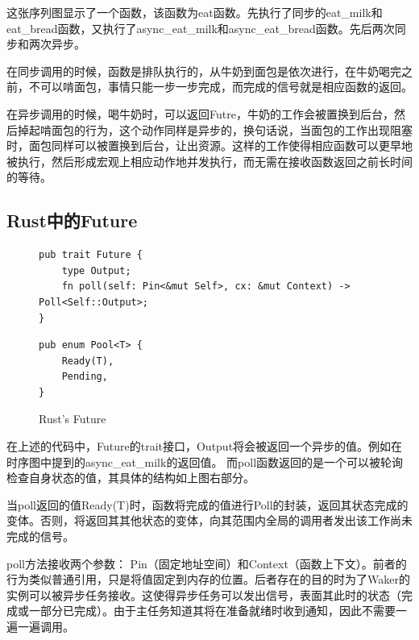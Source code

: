这张序列图显示了一个函数，该函数为eat函数。先执行了同步的eat\_milk和eat\_bread函数，又执行了async\_eat\_milk和async\_eat\_bread函数。先后两次同步和两次异步。


在同步调用的时候，函数是排队执行的，从牛奶到面包是依次进行，在牛奶喝完之前，不可以啃面包，事情只能一步一步完成，而完成的信号就是相应函数的返回。


在异步调用的时候，喝牛奶时，可以返回Futre，牛奶的工作会被置换到后台，然后掉起啃面包的行为，这个动作同样是异步的，换句话说，当面包的工作出现阻塞时，面包同样可以被置换到后台，让出资源。这样的工作使得相应函数可以更早地被执行，然后形成宏观上相应动作地并发执行，而无需在接收函数返回之前长时间的等待。

\subsection{Rust中的Future}

\begin{figure}[htbp]
    \figureCapSet
	\centering
	\begin{minipage}{0.49\linewidth}%
		\centering
\begin{lstlisting}[frame=none]
pub trait Future {
    type Output;
    fn poll(self: Pin<&mut Self>, cx: &mut Context) -> Poll<Self::Output>;
}
\end{lstlisting}
	\end{minipage}
    \hfill
	\begin{minipage}{0.49\linewidth}
		\centering
        \begin{lstlisting}[frame=none]
pub enum Pool<T> {
    Ready(T),
    Pending,
}
        \end{lstlisting}
	\end{minipage}
    \caption{Rust's Future}
\end{figure}

在上述的代码中，Future的trait接口，Output将会被返回一个异步的值。例如在时序图中提到的async\_eat\_milk的返回值。 而poll函数返回的是一个可以被轮询检查自身状态的值，其具体的结构如上图右部分。 

当poll返回的值Ready(T)时，函数将完成的值进行Poll的封装，返回其状态完成的变体。否则，将返回其其他状态的变体，向其范围内全局的调用者发出该工作尚未完成的信号。

poll方法接收两个参数： Pin（固定地址空间）和Context（函数上下文）。前者的行为类似普通引用，只是将值固定到内存的位置。后者存在的目的时为了Waker的实例可以被异步任务接收。这使得异步任务可以发出信号，表面其此时的状态（完成或一部分已完成）。由于主任务知道其将在准备就绪时收到通知，因此不需要一遍一遍调用。

